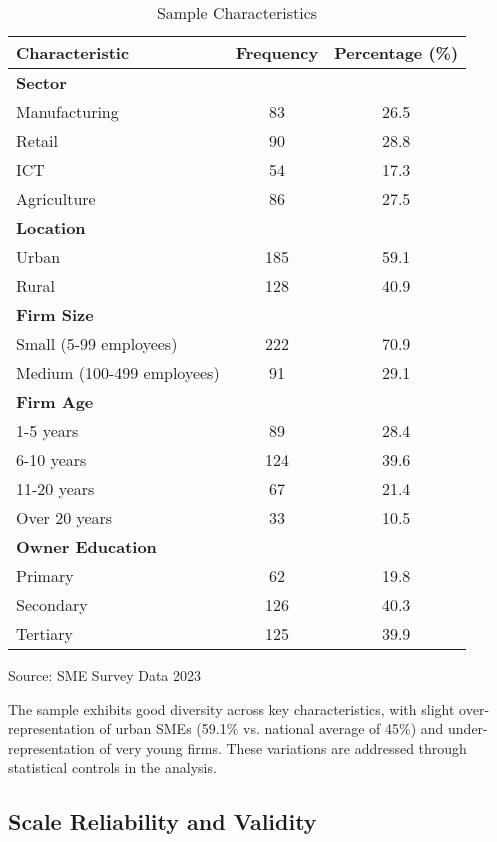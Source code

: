 \begin{table}[H]
\centering
\caption{Sample Characteristics}
\label{tab:sample_characteristics}
\begin{tabular}{@{}lcc@{}}
\toprule
\textbf{Characteristic} & \textbf{Frequency} & \textbf{Percentage (\%)} \\
\midrule
\textbf{Sector} & & \\
Manufacturing & 83 & 26.5 \\
Retail & 90 & 28.8 \\
ICT & 54 & 17.3 \\
Agriculture & 86 & 27.5 \\
\midrule
\textbf{Location} & & \\
Urban & 185 & 59.1 \\
Rural & 128 & 40.9 \\
\midrule
\textbf{Firm Size} & & \\
Small (5-99 employees) & 222 & 70.9 \\
Medium (100-499 employees) & 91 & 29.1 \\
\midrule
\textbf{Firm Age} & & \\
1-5 years & 89 & 28.4 \\
6-10 years & 124 & 39.6 \\
11-20 years & 67 & 21.4 \\
Over 20 years & 33 & 10.5 \\
\midrule
\textbf{Owner Education} & & \\
Primary & 62 & 19.8 \\
Secondary & 126 & 40.3 \\
Tertiary & 125 & 39.9 \\
\bottomrule
\end{tabular}
\begin{tablenotes}
\item Source: SME Survey Data 2023
\end{tablenotes}
\end{table}

The sample exhibits good diversity across key characteristics, with slight over-representation of urban SMEs (59.1\% vs. national average of 45\%) and under-representation of very young firms. These variations are addressed through statistical controls in the analysis.

\subsection{Scale Reliability and Validity}


